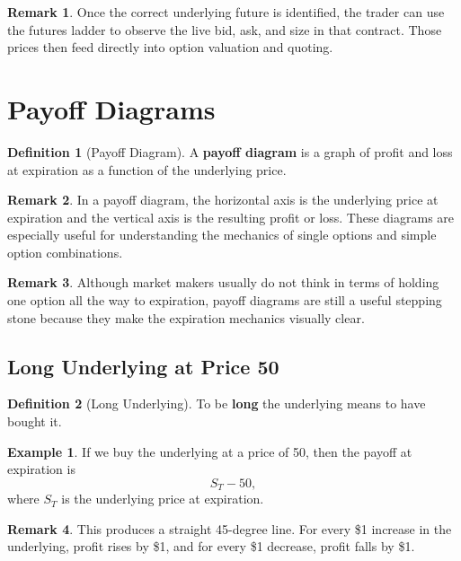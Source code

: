 \documentclass[11pt]{article}
\theoremstyle{definition}
\newtheorem{definition}{Definition}[section]
\newtheorem{example}{Example}[section]
\newtheorem{remark}{Remark}[section]
\begin{document}
\begin{remark}
Once the correct underlying future is identified, the trader can use the futures ladder to observe the live bid, ask, and size in that contract. Those prices then feed directly into option valuation and quoting.
\end{remark}

\section{Payoff Diagrams}

\begin{definition}[Payoff Diagram]
A \textbf{payoff diagram} is a graph of profit and loss at expiration as a function of the underlying price.
\end{definition}

\begin{remark}
In a payoff diagram, the horizontal axis is the underlying price at expiration and the vertical axis is the resulting profit or loss. These diagrams are especially useful for understanding the mechanics of single options and simple option combinations.
\end{remark}

\begin{remark}
Although market makers usually do not think in terms of holding one option all the way to expiration, payoff diagrams are still a useful stepping stone because they make the expiration mechanics visually clear. 
\end{remark}

\subsection{Long Underlying at Price 50}

\begin{definition}[Long Underlying]
To be \textbf{long} the underlying means to have bought it.
\end{definition}

\begin{example}
If we buy the underlying at a price of 50, then the payoff at expiration is
\[
S_T - 50,
\]
where \(S_T\) is the underlying price at expiration.
\end{example}

\begin{remark}
This produces a straight 45-degree line. For every \$1 increase in the underlying, profit rises by \$1, and for every \$1 decrease, profit falls by \$1.
\end{remark}
\end{document}
